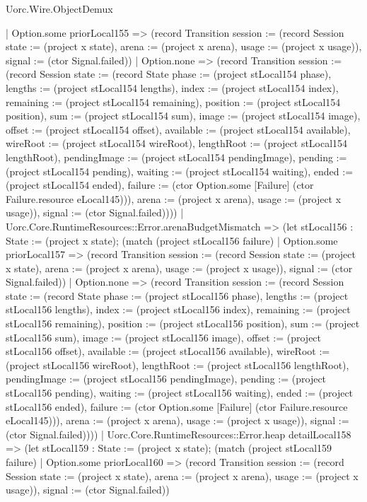 \begin{lexlean}{Uorc.Wire.ObjectDemux}
\begin{semanticmodule}
{        | Option.some priorLocal155 => (record Transition {session := (record Session {state := (project x state), arena := (project x arena), usage := (project x usage)}), signal := (ctor Signal.failed)})
        | Option.none => (record Transition {session := (record Session {state := (record State {phase := (project stLocal154 phase), lengths := (project stLocal154 lengths), index := (project stLocal154 index), remaining := (project stLocal154 remaining), position := (project stLocal154 position), sum := (project stLocal154 sum), image := (project stLocal154 image), offset := (project stLocal154 offset), available := (project stLocal154 available), wireRoot := (project stLocal154 wireRoot), lengthRoot := (project stLocal154 lengthRoot), pendingImage := (project stLocal154 pendingImage), pending := (project stLocal154 pending), waiting := (project stLocal154 waiting), ended := (project stLocal154 ended), failure := (ctor Option.some [Failure] (ctor Failure.resource eLocal145))}), arena := (project x arena), usage := (project x usage)}), signal := (ctor Signal.failed)})))
      | Uorc.Core.RuntimeResources::Error.arenaBudgetMismatch => (let stLocal156 : State := (project x state); (match (project stLocal156 failure)
        | Option.some priorLocal157 => (record Transition {session := (record Session {state := (project x state), arena := (project x arena), usage := (project x usage)}), signal := (ctor Signal.failed)})
        | Option.none => (record Transition {session := (record Session {state := (record State {phase := (project stLocal156 phase), lengths := (project stLocal156 lengths), index := (project stLocal156 index), remaining := (project stLocal156 remaining), position := (project stLocal156 position), sum := (project stLocal156 sum), image := (project stLocal156 image), offset := (project stLocal156 offset), available := (project stLocal156 available), wireRoot := (project stLocal156 wireRoot), lengthRoot := (project stLocal156 lengthRoot), pendingImage := (project stLocal156 pendingImage), pending := (project stLocal156 pending), waiting := (project stLocal156 waiting), ended := (project stLocal156 ended), failure := (ctor Option.some [Failure] (ctor Failure.resource eLocal145))}), arena := (project x arena), usage := (project x usage)}), signal := (ctor Signal.failed)})))
      | Uorc.Core.RuntimeResources::Error.heap detailLocal158 => (let stLocal159 : State := (project x state); (match (project stLocal159 failure)
        | Option.some priorLocal160 => (record Transition {session := (record Session {state := (project x state), arena := (project x arena), usage := (project x usage)}), signal := (ctor Signal.failed)})
}
\end{semanticmodule}
\end{lexlean}
